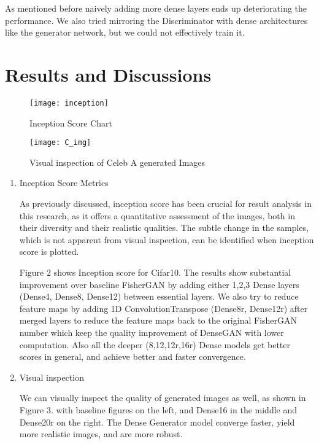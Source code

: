 \documentclass{article}
\begin{document}
As mentioned before naively adding more dense layers ends up deteriorating the performance. We also tried mirroring the Discriminator with dense architectures like the generator network, but we could not effectively train it.

\section{Results and Discussions}
\label{sec:results}

\begin{figure}
\caption{Inception Score Chart}
\texttt{[image: inception]}
\end{figure}


\begin{figure*}[h]
\caption{Visual inspection of Celeb A generated Images}
\texttt{[image: C\_img]}
\end{figure*}


\begin{enumerate}

\item Inception Score Metrics

As previously discussed, inception score has been crucial for result analysis in this research, as it offers a quantitative assessment of the images, both in their diversity and their realistic qualities. The subtle change in the samples, which is not apparent from visual inspection, can be identified when inception score is plotted.

Figure 2 shows Inception score for Cifar10. The results show substantial improvement over baseline FisherGAN by adding either 1,2,3 Dense layers (Dense4, Dense8, Dense12) between essential layers. We also try to reduce feature maps by adding 1D ConvolutionTranspose (Dense8r, Dense12r) after merged layers to reduce the feature maps back to the original FisherGAN number which keep the quality improvement of DenseGAN with lower computation. Also all the deeper (8,12,12r,16r) Dense models get better scores in general, and achieve better and faster convergence.

\item Visual inspection

We can visually inspect the quality of generated images as well, as shown in Figure 3. with baseline figures on the left, and Dense16 in the middle and Dense20r on the right. The Dense Generator model converge faster, yield more realistic images, and are more robust.


\end{enumerate}
\end{document}
